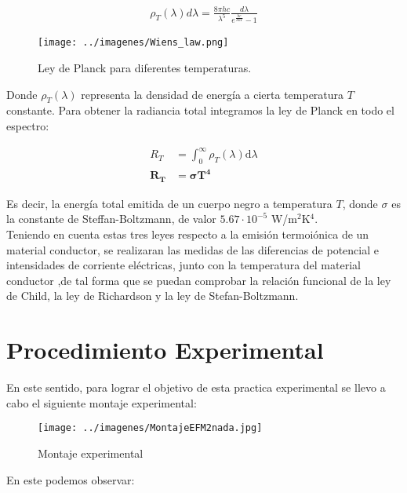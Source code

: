 \documentclass[%
 reprint,
 amsmath,amssymb,
 aps,
]{revtex4-2}
\begin{document}
\begin{align*}
    \rho_{T}(\lambda)d\lambda = \frac{8\pi h c}{\lambda^{5}}\frac{d\lambda}{e^{\frac{hc}{\lambda kT}}-1}
\end{align*}

\begin{figure}[H]
    \centering
    \texttt{[image: ../imagenes/Wiens\_law.png]}
    \caption{Ley de Planck para diferentes temperaturas.}
    \label{fig:5}
\end{figure}


\vspace{0.2 cm}
Donde $\rho_{T}(\lambda)$ representa la densidad de energía a cierta temperatura $T$ constante. Para obtener la radiancia total integramos la ley de Planck en todo el espectro:

\begin{align}
    \nonumber
    R_T &= \int_{0}^{\infty} \rho_{T}(\lambda) \mathrm{d}\lambda\\
    \boldsymbol{R_T} &\boldsymbol{= \sigma T^4}
    \label{eq: Ley de Stefan}
\end{align}


\vspace{0.2 cm}
Es decir, la energía total emitida de un cuerpo negro a temperatura $T$, donde $\sigma$ es la constante de Steffan-Boltzmann, de valor $5.67\cdot 10^{-5}$ W/m$^{2}$K$^{4}$.
\\

Teniendo en cuenta estas tres leyes respecto a la emisión termoiónica de un material conductor, se realizaran las medidas de las diferencias de potencial e intensidades de corriente eléctricas, junto con la temperatura del material conductor ,de tal forma que se puedan comprobar la relación funcional de la ley de Child, la ley de Richardson y la ley de Stefan-Boltzmann.

\section{Procedimiento Experimental}
En este sentido, para lograr el objetivo de esta practica experimental se llevo a cabo el siguiente montaje experimental:

\begin{figure}[H]
    \centering
    \texttt{[image: ../imagenes/MontajeEFM2nada.jpg]}
    \caption{Montaje experimental}
    \label{montajel}
\end{figure}

En este podemos observar:
\end{document}
